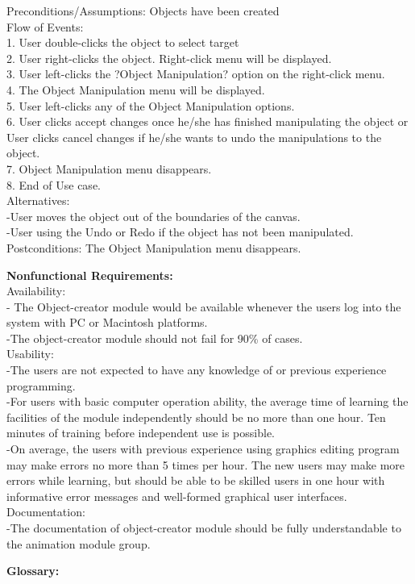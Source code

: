 \documentclass[12pt]{report}
\begin{document}
Preconditions/Assumptions: Objects have been created\\[1\baselineskip]
Flow of Events: \\
1. User double-clicks the object to select target\\
2. User right-clicks the object. Right-click menu will be displayed.\\
3. User left-clicks the ?Object Manipulation? option on the right-click menu.\\
4. The Object Manipulation menu will be displayed. \\
5. User left-clicks any of the Object Manipulation options.\\
6. User clicks accept changes once he/she has finished manipulating the object or User clicks cancel changes if he/she wants to undo the manipulations to the object.\\
7. Object Manipulation menu disappears.\\
8. End of Use case.\\[1\baselineskip]
Alternatives:\\
-User moves the object out of the boundaries of the canvas.\\
-User using the Undo or Redo if the object has not been manipulated. \\[1\baselineskip]
Postconditions: The Object Manipulation menu disappears.\\

\pagebreak

{\bf\large Nonfunctional Requirements:}\\[1\baselineskip]
Availability: \\
- The Object-creator module would be available whenever the users log into the system with PC or Macintosh platforms.\\
-The object-creator module should not fail for 90\% of cases.\\[0\baselineskip]

Usability: \\
-The users are not expected to have any knowledge of or previous experience programming.\\
-For users with basic computer operation ability, the average time of learning the facilities of the module independently should be no more than one hour. Ten minutes of training before independent use is possible. \\
-On average, the users with previous experience using graphics editing program may make errors no more than 5 times per hour. The new users may make more errors while learning, but should be able to be skilled users in one hour with informative error messages and well-formed graphical user interfaces.\\[0\baselineskip]

Documentation:\\
-The documentation of object-creator module should be fully understandable to the animation module group.\\
\pagebreak

{\bf\large Glossary:}\\[1\baselineskip]
\end{document}
